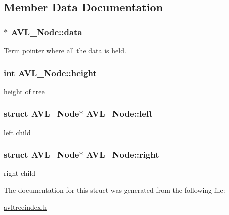\subsection{Member Data Documentation}
\hypertarget{struct_a_v_l___node_a6a9062cc45fa099a2c68763e1d52b894}{}
\subsubsection[{data}]{$\ast$ A\+V\+L\+\_\+\+Node\+::data}\label{struct_a_v_l___node_a6a9062cc45fa099a2c68763e1d52b894}


\hyperlink{class_term}{Term} pointer where all the data is held. 

\hypertarget{struct_a_v_l___node_a802b8e700879b7489730140f5e1fd121}{}
\subsubsection[{height}]{\setlength{\rightskip}{0pt plus 5cm}int A\+V\+L\+\_\+\+Node\+::height}\label{struct_a_v_l___node_a802b8e700879b7489730140f5e1fd121}


height of tree 

\hypertarget{struct_a_v_l___node_a7a5a4e3c99ef2c11b20a6a60aee247a8}{}
\subsubsection[{left}]{\setlength{\rightskip}{0pt plus 5cm}struct {\bf A\+V\+L\+\_\+\+Node}$\ast$ A\+V\+L\+\_\+\+Node\+::left}\label{struct_a_v_l___node_a7a5a4e3c99ef2c11b20a6a60aee247a8}


left child 

\hypertarget{struct_a_v_l___node_af0d0c4d5eaf62a9141711d1a10e3ba11}{}
\subsubsection[{right}]{\setlength{\rightskip}{0pt plus 5cm}struct {\bf A\+V\+L\+\_\+\+Node}$\ast$ A\+V\+L\+\_\+\+Node\+::right}\label{struct_a_v_l___node_af0d0c4d5eaf62a9141711d1a10e3ba11}


right child 



The documentation for this struct was generated from the following file\+:\begin{DoxyCompactItemize}
\item 
\hyperlink{avltreeindex_8h}{avltreeindex.\+h}\end{DoxyCompactItemize}
